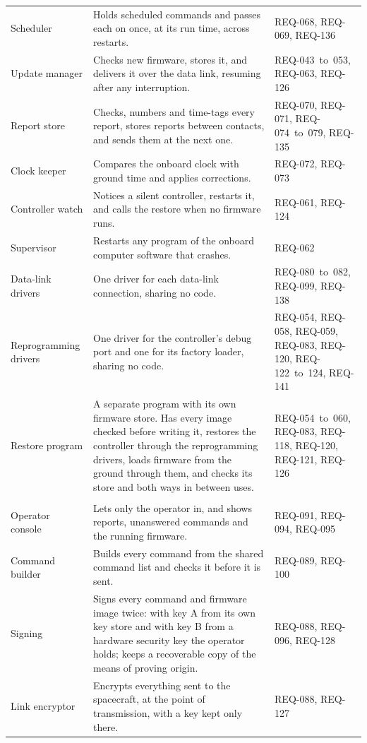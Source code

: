 \documentclass[11pt,a4paper]{article}
\begin{document}
{\begin{xltabular}{\textwidth}{@{}>{\raggedright\arraybackslash}p{2.9cm}>{\raggedright\arraybackslash}X>{\raggedright\arraybackslash}p{3.6cm}@{}}
Scheduler & Holds scheduled commands and passes each on once, at its run time, across restarts. & REQ-068, REQ-069, REQ-136 \\
Update manager & Checks new firmware, stores it, and delivers it over the data link, resuming after any interruption. & REQ-043~to~053, REQ-063, REQ-126 \\
Report store & Checks, numbers and time-tags every report, stores reports between contacts, and sends them at the next one. & REQ-070, REQ-071, REQ-074~to~079, REQ-135 \\
Clock keeper & Compares the onboard clock with ground time and applies corrections. & REQ-072, REQ-073 \\
Controller watch & Notices a silent controller, restarts it, and calls the restore when no firmware runs. & REQ-061, REQ-124 \\
Supervisor & Restarts any program of the onboard computer software that crashes. & REQ-062 \\
Data-link drivers & One driver for each data-link connection, sharing no code. & REQ-080~to~082, REQ-099, REQ-138 \\
Reprogramming drivers & One driver for the controller's debug port and one for its factory loader, sharing no code. & REQ-054, REQ-058, REQ-059, REQ-083, REQ-120, REQ-122~to~124, REQ-141 \\
Restore program & A separate program with its own firmware store. Has every image checked before writing it, restores the controller through the reprogramming drivers, loads firmware from the ground through them, and checks its store and both ways in between uses. & REQ-054~to~060, REQ-083, REQ-118, REQ-120, REQ-121, REQ-126 \\
 \\
Operator console & Lets only the operator in, and shows reports, unanswered commands and the running firmware. & REQ-091, REQ-094, REQ-095 \\
Command builder & Builds every command from the shared command list and checks it before it is sent. & REQ-089, REQ-100 \\
Signing & Signs every command and firmware image twice: with key A from its own key store and with key B from a hardware security key the operator holds; keeps a recoverable copy of the means of proving origin. & REQ-088, REQ-096, REQ-128 \\
Link encryptor & Encrypts everything sent to the spacecraft, at the point of transmission, with a key kept only there. & REQ-088, REQ-127 \\

\end{xltabular}}
\end{document}
